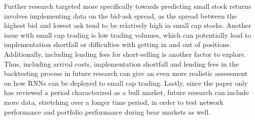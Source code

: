 \indent\newline 
Further research targeted more specifically towards predicting small stock returns involves implementing data on the bid-ask spread, as the spread between the highest bid and lowest ask tend to be relatively high in small cap stocks. Another issue with small cap trading is low trading volumes, which can potentially lead to implementation shortfall or difficulties with getting in and out of positions. Additionally, including lending fees for short-selling is another factor to explore. Thus, including arrival costs, implementation shortfall and lending fees in the backtesting process in future research can give an even more realistic assessment on how RNNs can be deployed to small cap trading. Lastly, since the paper only has reviewed a period characterized as a bull market,  future research can include more data, stretching over a longer time period, in order to test network performance and portfolio performance during bear markets as well.   